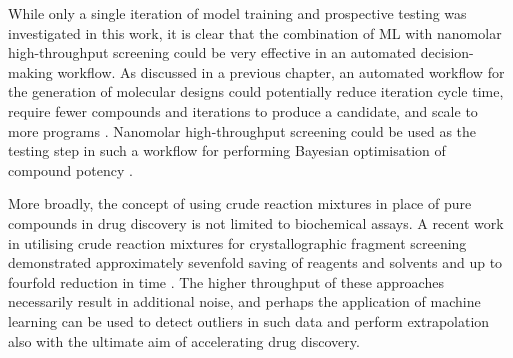 While only a single iteration of model training and prospective testing was investigated in this work, it is clear that the combination of ML with nanomolar high-throughput screening could be very effective in an automated decision-making workflow. As discussed in a previous chapter, an automated workflow for the generation of molecular designs could potentially reduce iteration cycle time, require fewer compounds and iterations to produce a candidate, and scale to more programs \cite{Schneider2018AutomatingDrugDiscovery, Coley2020Outlook, Goldman2022ChemicalDesignLevels}. Nanomolar high-throughput screening could be used as the testing step in such a workflow for performing Bayesian optimisation of compound potency \cite{korovina2019chembo}.

More broadly, the concept of using crude reaction mixtures in place of pure compounds in drug discovery is not limited to biochemical assays. A recent work in utilising crude reaction mixtures for crystallographic fragment screening demonstrated approximately sevenfold saving of reagents and solvents and up to fourfold reduction in time \cite{Baker2020FragementsFromCrude}. The higher throughput of these approaches necessarily result in additional noise, and perhaps the application of machine learning can be used to detect outliers in such data and perform extrapolation also with the ultimate aim of accelerating drug discovery.
